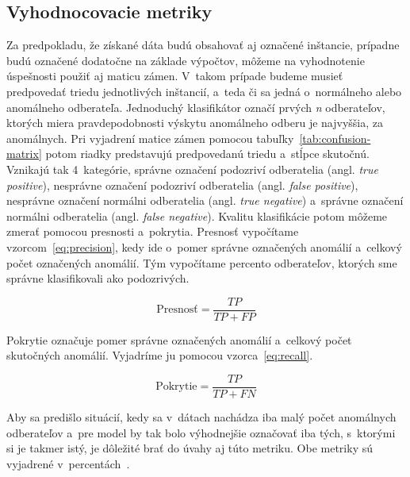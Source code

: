 \documentclass[a4paper,twoside,slovak,12pt,appendix]{article}
\begin{document}
\subsection{Vyhodnocovacie metriky}
\label{c:evaluation-metrics}
Za predpokladu, že získané dáta budú obsahovať aj označené inštancie, prípadne
budú označené dodatočne na základe výpočtov, môžeme na vyhodnotenie úspešnosti
použiť aj maticu zámen. V~takom prípade budeme musieť predpovedať triedu
jednotlivých inštancií, a~teda či sa jedná o~normálneho alebo anomálneho
odberateľa. Jednoduchý klasifikátor označí prvých \textit{n} odberateľov,
ktorých miera pravdepodobnosti výskytu anomálneho odberu je najvyššia, za
anomálnych. Pri vyjadrení matice zámen pomocou
tabuľky~\ref{tab:confusion-matrix} potom riadky predstavujú predpovedanú triedu
a~stĺpce skutočnú. Vznikajú tak 4~kategórie, správne označení podozriví
odberatelia (angl. \textit{true positive}), nesprávne označení podozriví
odberatelia (angl. \textit{false positive}), nesprávne označení normálni
odberatelia (angl. \textit{true negative}) a~správne označení normálni
odberatelia (angl. \textit{false negative}). Kvalitu klasifikácie potom môžeme
zmerať pomocou presnosti a~pokrytia. Presnosť vypočítame
vzorcom~\ref{eq:precision}, kedy ide o~pomer správne označených anomálií
a~celkový počet označených anomálií. Tým vypočítame percento odberateľov,
ktorých sme správne klasifikovali ako podozrivých.

\begin{equation}
	\label{eq:precision}
  \text{Presnosť} = \frac{TP}{TP + FP}
\end{equation}

\noindent
Pokrytie označuje pomer správne označených anomálií a~celkový počet skutočných
anomálií. Vyjadríme ju pomocou vzorca~\ref{eq:recall}.

\begin{equation}
	\label{eq:recall}
  \text{Pokrytie} = \frac{TP}{TP + FN}
\end{equation}

\noindent
Aby sa predišlo situácií, kedy sa v~dátach nachádza iba malý počet anomálnych
odberateľov a~pre model by tak bolo výhodnejšie označovať iba tých, s~ktorými si
je takmer istý, je dôležité brať do úvahy aj túto metriku. Obe metriky sú
vyjadrené v~percentách~\cite{Trevizan2015,Wei2006}.
\end{document}
